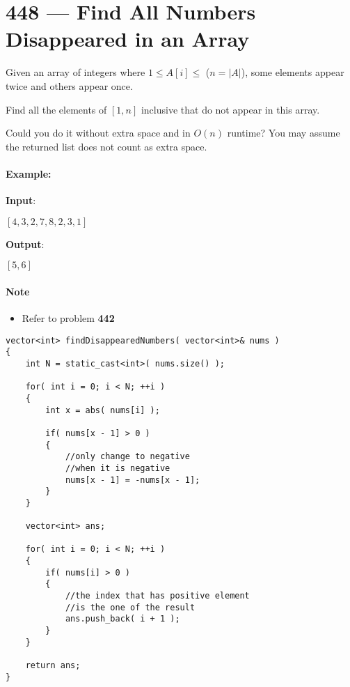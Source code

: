 \section{448 --- Find All Numbers Disappeared in an Array}
Given an array of integers where $1 \leq A[i] \leq$ ($n  = \lvert A\rvert$), some elements appear twice and others appear once.

Find all the elements of $[1, n]$ inclusive that do not appear in this array.

Could you do it without extra space and in $O(n)$ runtime? You may assume the returned list does not count as extra space.

\paragraph{Example:}

\begin{flushleft}
\textbf{Input}:

$[4,3,2,7,8,2,3,1]$

\textbf{Output}:

$[5,6]$

\end{flushleft}

\paragraph{Note}
\begin{itemize}
\item Refer to problem \textbf{442}
\end{itemize}

\setcounter{lstlisting}{0}
\begin{lstlisting}[style=customc, caption={Using Index As Key}]
vector<int> findDisappearedNumbers( vector<int>& nums )
{
    int N = static_cast<int>( nums.size() );

    for( int i = 0; i < N; ++i )
    {
        int x = abs( nums[i] );

        if( nums[x - 1] > 0 )
        {
            //only change to negative
            //when it is negative
            nums[x - 1] = -nums[x - 1];
        }
    }

    vector<int> ans;

    for( int i = 0; i < N; ++i )
    {
        if( nums[i] > 0 )
        {
            //the index that has positive element
            //is the one of the result
            ans.push_back( i + 1 );
        }
    }

    return ans;
}
\end{lstlisting}